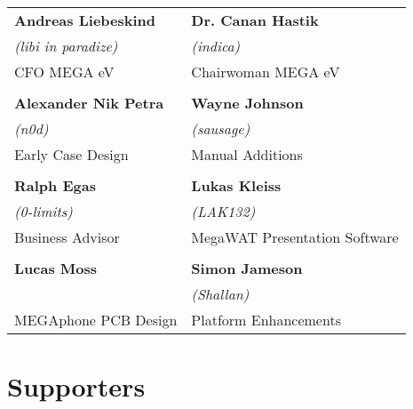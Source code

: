 \setlength{\tabcolsep}{1mm}
\begin{tabular}{p{6cm}p{6cm}}

{\large\bf Andreas Liebeskind}     & {\large\bf Dr. Canan Hastik} \\
 \textit{(libi in paradize)}       & \textit{(indica)} \\
CFO MEGA eV                        & Chairwoman MEGA eV \\
& \\
{\large\bf Alexander Nik Petra}    & {\large\bf Wayne Johnson} \\
 \textit{(n0d)}                    &  \textit{(sausage)} \\
Early Case Design                  & Manual Additions \\
& \\
{\large\bf Ralph Egas}             & {\large\bf Lukas Kleiss} \\
 \textit{(0-limits)}               & \textit{(LAK132)} \\
Business Advisor                   & MegaWAT Presentation Software \\
& \\
{\large\bf Lucas Moss}             & {\large\bf Simon Jameson} \\
                                   & \textit{(Shallan)} \\
MEGAphone PCB Design               & Platform Enhancements \\
\end{tabular}

\section{Supporters}


